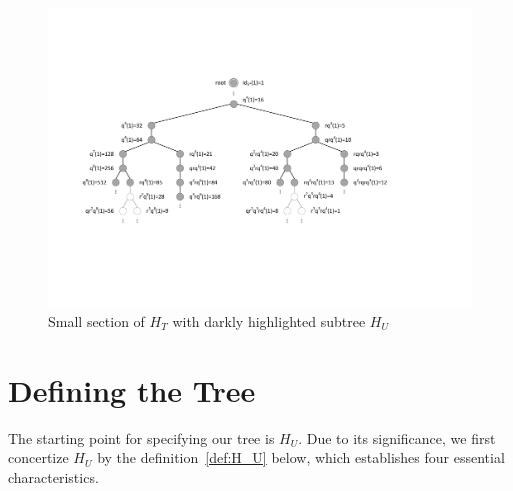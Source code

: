 \begin{figure}
	\includegraphics[trim=2.3cm 5.8cm 5.9cm 4.8cm, 
	width=1.00\textwidth,page=1]{figures/caytree.pdf}
	\caption{Small section of $H_T$ with darkly highlighted subtree $H_U$}
	\label{fig:1}
\end{figure}

\section{Defining the Tree}
The starting point for specifying our tree is $H_U$. Due to its
significance, we first concertize $H_U$ by the definition~\ref{def:H_U}
below, which establishes four essential characteristics.

